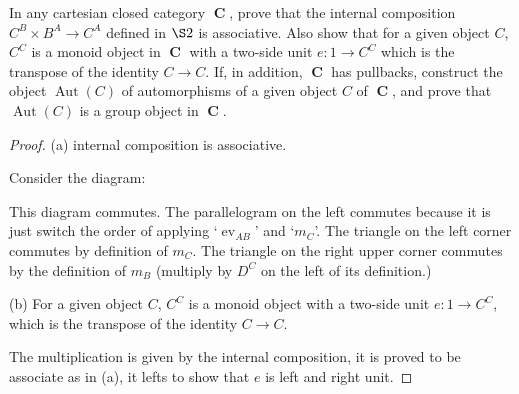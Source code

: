 \documentclass[a4paper]{article}
\title{\hmwkTitle}
\author{\textbf{\hmwkAuthorName}}
\date{\hmwkDueDate}
\DeclareMathOperator{\C}{\mathbf {C}}
\DeclareMathOperator{\Aut}{\text {Aut}}
\DeclareMathOperator{\ev}{\text {ev}}
\begin{document}
\begin{titlepage}
    \maketitle
\end{titlepage}
\begin{question}
    In any cartesian closed category $\C$, prove that the internal composition $C^B\times B^A\to C^A$ defined in $\S 2$ is associative. Also show that for a given object $C$, $C^C$ is a monoid object in $\C$ with a two-side unit $e:1\to C^C$ which is the transpose of the identity $C\to C$. If, in addition, $\C$ has pullbacks, construct the object $\Aut(C)$ of automorphisms of a given object $C$ of $\C$, and prove that $\Aut(C)$ is a group object in $\C$.
\end{question}
\begin{proof}
    (a) internal composition is associative. 

    Consider the diagram:
    \begin{center}
    \end{center}

    This diagram commutes. The parallelogram on the left commutes because it is just switch the order of applying `$\ev_{AB}$' and `$m_C$'. The triangle on the left corner commutes by definition of $m_C$. The triangle on the right upper corner commutes by the definition of $m_B$ (multiply by $D^C$ on the left of its definition.)

    (b) For a given object $C$, $C^C$ is a monoid object with a two-side unit $e:1\to C^C$, which is the transpose of the identity $C\to C$.

    The multiplication is given by the internal composition, it is proved to be associate as in (a), it lefts to show that $e$ is left and right unit. 


\end{proof}
\end{document}

